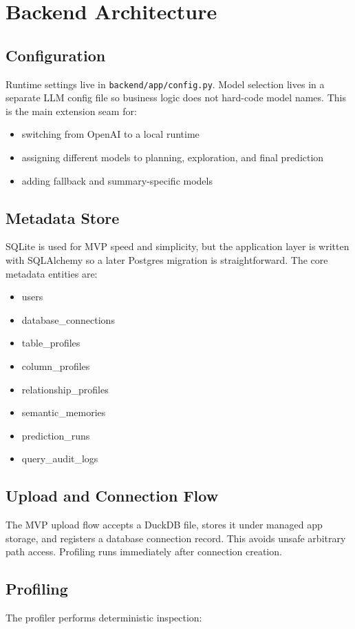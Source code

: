 \documentclass[11pt]{book}
\begin{document}
\chapter{Backend Architecture}
\section{Configuration}
Runtime settings live in \texttt{backend/app/config.py}. Model selection lives in a separate LLM
config file so business logic does not hard-code model names. This is the main extension seam for:

\begin{itemize}
\item switching from OpenAI to a local runtime
\item assigning different models to planning, exploration, and final prediction
\item adding fallback and summary-specific models
\end{itemize}

\section{Metadata Store}
SQLite is used for MVP speed and simplicity, but the application layer is written with SQLAlchemy
so a later Postgres migration is straightforward. The core metadata entities are:

\begin{itemize}
\item users
\item database\_connections
\item table\_profiles
\item column\_profiles
\item relationship\_profiles
\item semantic\_memories
\item prediction\_runs
\item query\_audit\_logs
\end{itemize}

\section{Upload and Connection Flow}
The MVP upload flow accepts a DuckDB file, stores it under managed app storage, and registers a
database connection record. This avoids unsafe arbitrary path access. Profiling runs immediately
after connection creation.

\section{Profiling}
The profiler performs deterministic inspection:
\end{document}
